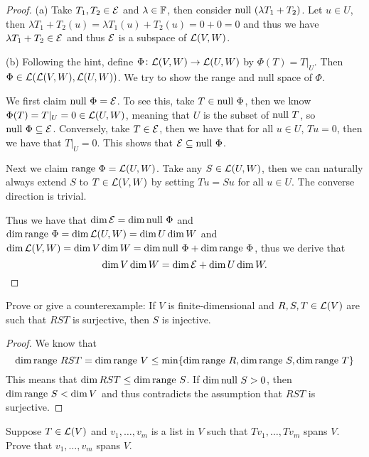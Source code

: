 \documentclass{extarticle}
\begin{document}
\begin{proof}
(a) Take \(T_1, T_2 \in \mathcal{E}\) and \(\lambda \in \mathbb{F}\), then consider \(\text{null }(\lambda T_1 + T_2)\). Let 
\(u \in U\), then \(\lambda T_1 + T_2 (u) = \lambda T_1 (u) + T_2 (u) = 0 + 0 = 0\) and thus we have 
\(\lambda T_1 + T_2  \in \mathcal{E}\) and thus \(\mathcal{E}\) is a subspace of \(\mathcal{L}(V, W)\). 

(b) Following the hint, define \(\Phi \colon \mathcal{L}(V, W) \to \mathcal{L}(U, W)\) by \(\Phi(T) = T |_U\). Then 
\(\Phi \in \mathcal{L}(\mathcal{L}(V, W), \mathcal{L}(U, W))\). We try to show the range and null space of \(\Phi\). 

We first 
claim \(\text{null } \Phi = \mathcal{E}\). To see this, take \(T \in \text{null } \Phi\), then we know \(\Phi(T) 
= T |_U = 0 \in \mathcal{L}(U, W)\), meaning that \(U\) is the subset of \(\text{null } T\), so \(\text{null } \Phi \subseteq \mathcal{E} \). 
Conversely, take \(T \in \mathcal{E}\), then we have that for all \(u \in U\), \(Tu = 0\), then we have that 
\(T |_U = 0\). This shows that \(\mathcal{E} \subseteq \text{null } \Phi\). 

Next we claim \(\text{range } \Phi = \mathcal{L}(U, W)\). Take any \(S \in \mathcal{L}(U, W)\), then we can naturally always extend 
\(S\) to \(T \in \mathcal{L}(V, W)\) by setting \(T u = S u\) for all \(u \in U\). The converse direction is trivial. 

Thus we have that \(\dim \mathcal{E} = \dim \text{null } \Phi\) and \(\dim \text{range } \Phi = \dim \mathcal{L}(U, W) = \dim U \dim W\)
and \(\dim \mathcal{L}(V, W) = \dim V \dim W = \dim \text{null } \Phi + \dim \text{range } \Phi\), thus we derive that 
\[\dim V \dim W = \dim \mathcal{E} + \dim U \dim W.\]
\end{proof}

\begin{problem}{14}
    Prove or give a counterexample: If \(V\) is finite-dimensional and \(R, S, T \in \mathcal{L}(V)\) are such 
    that \(RST\) is surjective, then \(S\) is injective. 
\end{problem}

\begin{proof}
We know that \[\dim \text{range } RST = \dim \text{range } V \leq \min \{\dim \text{range } R, \dim \text{range } S, \dim \text{range } T\} \]
This means that \(\dim RST \leq \dim \text{range } S\).
If \(\dim \text{null } S > 0\), then \(\dim \text{range } S < \dim V\) and thus 
contradicts the assumption that \(RST\) is surjective. 
\end{proof}

\begin{problem}{15}
    Suppose \(T \in \mathcal{L}(V)\) and \(v_1, \ldots, v_m\) is a list in \(V\) such that \(T v_1, \ldots, T v_m\)
    spans \(V\). Prove that \(v_1, \ldots, v_m\) spans \(V\). 
\end{problem}
\end{document}
